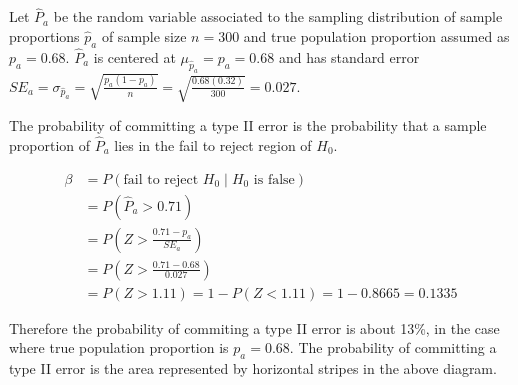 \documentclass{article}
\begin{document}
Let $\hat{P}_a$ be the random variable associated to the sampling distribution of sample proportions $\hat{p}_a$ of sample size $n=300$ and true population proportion 
assumed as $p_a = 0.68$. $\hat{P}_a$  is
centered at $\mu_{\hat{p}_a}=p_a=0.68$ and has standard error
$SE_a=\sigma_{\hat{p}_a}=\sqrt{\frac{p_a(1-p_a)}{n}}=\sqrt{\frac{0.68(0.32)}{300}}=0.027$.\\

\begin{center}
\end{center}

The probability of committing a type II error is the probability that a sample proportion of $\hat{P}_a$ lies in the fail to reject region of $H_0$. 

\begin{align*}
\beta &= P(\text{fail to reject $H_0$}\;|\;\text{$H_0$ is false})\\
&= P(\hat{P}_a>0.71)\\
&= P\left(Z>\frac{0.71-p_a}{SE_a}\right)\\
&= P\left(Z>\frac{0.71-0.68}{0.027}\right)\\
&= P(Z>1.11) = 1 - P(Z<1.11) = 1 - 0.8665 = 0.1335
\end{align*}

Therefore the probability of commiting a type II error 
is about 13\%, in the case where true population proportion is $p_a=0.68$. 
The probability of committing a type II error is the area represented by horizontal stripes in the above diagram.\\
\vspace{0.1in}
\end{document}
